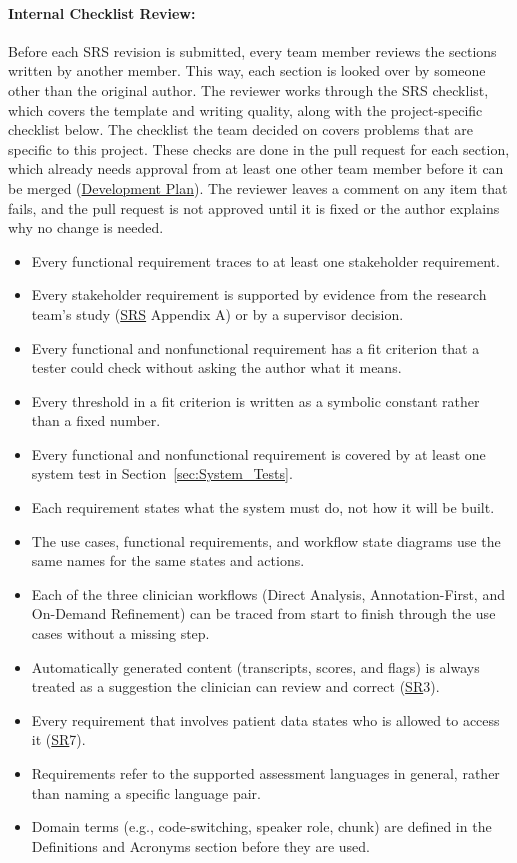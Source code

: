 \documentclass[12pt, titlepage]{article}
\newcommand{\checkbox}{\ding{113}} %
\newcommand{\SRSLink}{\href{https://github.com/Nour-Fawaz/MacaBoca/blob/main/pdfs/SRS/SRS.pdf}{SRS}}
\newcommand{\DevPlanLink}{\href{https://github.com/Nour-Fawaz/MacaBoca/blob/main/pdfs/DevelopmentPlan/DevelopmentPlan.pdf}{Development Plan}}
\newcommand{\srssr}[1]{\href{https://github.com/Nour-Fawaz/MacaBoca/blob/main/pdfs/SRS/SRS.pdf}{SR}}
\renewcommand{\_}{\oldunderscore\allowbreak}
\begin{document}
\paragraph{Internal Checklist Review:}
Before each SRS revision is submitted, every team member reviews the sections written by another member. This way, each section is looked over by someone other than the original author. 
The reviewer works through the SRS checklist, which covers the template and writing quality, along with the project-specific checklist below. The checklist the team decided on covers problems that are specific to this project. 
These checks are done in the pull request for each section, which already needs approval from at least one other team member before it can be merged (\DevPlanLink). 
The reviewer leaves a comment on any item that fails, and the pull request is not approved until it is fixed or the author explains why no change is needed.

\begin{itemize}[label=\checkbox]
  \item Every functional requirement traces to at least one stakeholder requirement.
  \item Every stakeholder requirement is supported by evidence from the research team's study (\SRSLink{} Appendix A) or by a supervisor decision.
  \item Every functional and nonfunctional requirement has a fit criterion that a tester could check without asking the author what it means.
  \item Every threshold in a fit criterion is written as a symbolic constant rather than a fixed number.
  \item Every functional and nonfunctional requirement is covered by at least one system test in Section~\ref{sec:System_Tests}.
  \item Each requirement states what the system must do, not how it will be built.
  \item The use cases, functional requirements, and workflow state diagrams use the same names for the same states and actions.
  \item Each of the three clinician workflows (Direct Analysis, Annotation-First, and On-Demand Refinement) can be traced from start to finish through the use cases without a missing step.
  \item Automatically generated content (transcripts, scores, and flags) is always treated as a suggestion the clinician can review and correct (\srssr*{3}).
  \item Every requirement that involves patient data states who is allowed to access it (\srssr*{7}).
  \item Requirements refer to the supported assessment languages in general, rather than naming a specific language pair.
  \item Domain terms (e.g., code-switching, speaker role, chunk) are defined in the Definitions and Acronyms section before they are used.
\end{itemize}
\end{document}
